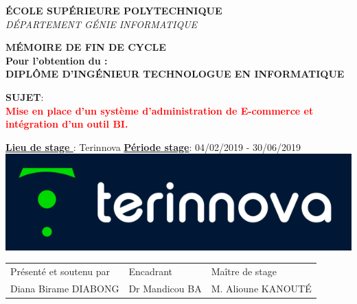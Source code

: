 \documentclass[a4paper, 12pt]{report}
\begin{document}
\begin{titlepage}
\textsc{\small \textbf{ÉCOLE SUPÉRIEURE POLYTECHNIQUE}}\\[0.15cm] %
\textsc{\small {\textit {DÉPARTEMENT GÉNIE INFORMATIQUE}}}\\[0.15cm] %

\begin{tcolorbox}[colback=white,colframe=myblue]
\centering
 \textcolor{myblue}{\small{\textbf{MÉMOIRE DE FIN DE CYCLE}}}\\
\small{\textbf{Pour l’obtention du :} \\
\textbf{DIPLÔME D'INGÉNIEUR TECHNOLOGUE EN INFORMATIQUE}} %
\end{tcolorbox}

\begin{tcolorbox}[colback=white,colframe=myblue]
\centering
\textbf{\small{SUJET}}: \\
\textcolor{red}{\textbf {Mise en place d'un système d'administration de E-commerce et intégration d'un outil BI.}} %
\end{tcolorbox}

 

\begin{tcolorbox}[colback=white,colframe=myblue]
\small{\textbf{\underline{Lieu de stage }}: \textcolor{myblue}{Terinnova} \quad \textbf{\underline{Période stage}}: \textcolor{myblue}{04/02/2019 - 30/06/2019}}\\
\centering \newline
\includegraphics[scale=.6]{img/terinnova.png} %
\end{tcolorbox}

\begin{tcolorbox}[colback=white,colframe=myblue]
\begin{tabular}{lll}
Présenté et soutenu par & Encadrant & Maître de stage\\
Diana Birame DIABONG & Dr Mandicou BA & M. Alioune KANOUTÉ
\end{tabular}
\end{tcolorbox}



\end{titlepage}
\end{document}
